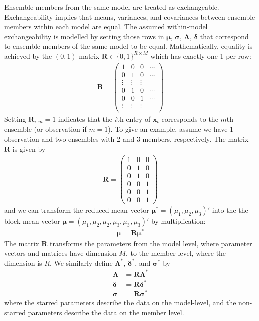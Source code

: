 \documentclass[12pt]{article}
\renewcommand{\vec}[1]{\bm{#1}}
\newcommand{\mat}[1]{\bm{#1}}
\begin{document}
Ensemble members from the same model are treated as exchangeable. 
Exchangeability implies that means, variances, and covariances between ensemble members within each model are equal.
The assumed within-model exchangeability is modelled by setting those rows in $\vec{\mu}$, $\vec{\sigma}$, $\mat{\Lambda}$, $\vec{\delta}$ that correspond to ensemble members of the same model to be equal.
Mathematically, equality is achieved by the $(0,1)$-matrix $\mat{R} \in \{0,1\}^{R\times M}$ which has exactly one 1 per row:
%
\begin{align}
\mat{R} = \left( \begin{matrix} 1 & 0 & 0 & \cdots \\ 0 & 1 & 0 & \cdots \\ \vdots & \vdots & \vdots & \\ 0 & 1 & 0 & \cdots \\ 0 & 0 & 1 & \cdots \\ \vdots & \vdots & \vdots & \\  \end{matrix}\right)
\end{align}
%
Setting $\mat{R}_{i,m} = 1$ indicates that the $i$th entry of $\vec{x}_t$ corresponds to the $m$th ensemble (or observation if $m=1$).
To give an example, assume we have 1 observation and two ensembles with 2 and 3 members, respectively.
The matrix $\mat{R}$ is given by
%
\begin{align}
\mat{R} = \left( \begin{matrix} 1 & 0 & 0 \\ 0 & 1 & 0 \\ 0 & 1 & 0 \\ 0 & 0 & 1 \\0 & 0 & 1 \\  0 & 0 & 1 \end{matrix} \right)
\end{align}
%
and we can transform the reduced mean vector $\vec{\mu}^* = (\mu_1, \mu_2, \mu_3)'$ into the the block mean vector $\vec{\mu} = (\mu_1, \mu_2, \mu_2, \mu_3, \mu_3, \mu_3)'$ by multiplication:
%
\begin{align}
\vec{\mu} = \mat{R} \vec{\mu}^*
\end{align}
%
The matrix $\mat{R}$ transforms the parameters from the model level, where parameter vectors and matrices have dimension $M$, to the member level, where the dimension is $R$. 
We similarly define $\mat{\Lambda}^*$, $\vec{\delta}^*$, and $\vec{\sigma}^*$ by
%
\begin{align}
\mat{\Lambda} & = \mat{R}\mat{\Lambda}^*\\
\vec{\delta} & = \mat{R}\vec{\delta}^*\\
\vec{\sigma} & = \mat{R}\vec{\sigma}^*
\end{align}
%
where the starred parameters describe the data on the model-level, and the non-starred parameters describe the data on the member level.
\end{document}
